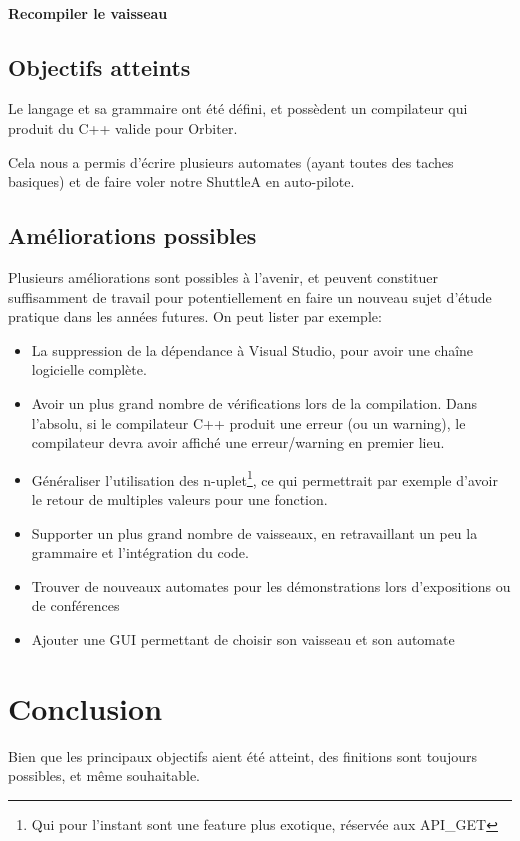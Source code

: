 \documentclass[a4paper,11pt]{article}
\begin{document}
        \paragraph{Recompiler le vaisseau}
            

    \subsection{Objectifs atteints}
        Le langage et sa grammaire ont été défini, et possèdent un compilateur qui produit du C++ valide pour Orbiter.
        
        Cela nous a permis d'écrire plusieurs automates (ayant toutes des taches basiques) et de faire voler notre ShuttleA en auto-pilote.

    \subsection{Améliorations possibles}
        Plusieurs améliorations sont possibles à l'avenir, et peuvent constituer suffisamment de travail pour potentiellement en faire un nouveau sujet d'étude pratique dans les années futures.
        On peut lister par exemple:
        \begin{itemize}
            \item La suppression de la dépendance à Visual Studio, pour avoir une chaîne logicielle complète.
            \item Avoir un plus grand nombre de vérifications lors de la compilation. Dans l'absolu, si le compilateur C++ produit une erreur (ou un warning), le compilateur devra avoir affiché une erreur/warning en premier lieu.
            \item Généraliser l'utilisation des n-uplet\footnote{Qui pour l'instant sont une feature plus exotique, réservée aux API\_GET}, ce qui permettrait par exemple d'avoir le retour de multiples valeurs pour une fonction.
            \item Supporter un plus grand nombre de vaisseaux, en retravaillant un peu la grammaire et l'intégration du code.
            \item Trouver de nouveaux automates pour les démonstrations lors d'expositions ou de conférences 
            \item Ajouter une GUI permettant de choisir son vaisseau et son automate
        \end{itemize}

\section{Conclusion}
    Bien que les principaux objectifs aient été atteint, des finitions sont toujours possibles, et même souhaitable.
        
\end{document}
